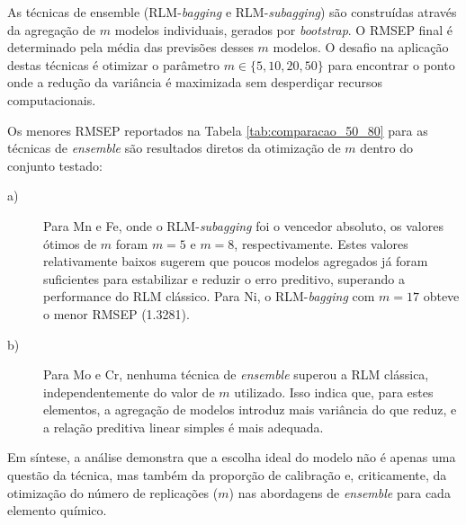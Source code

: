 As técnicas de ensemble (RLM-\textit{bagging} e RLM-\textit{subagging}) são construídas através da agregação de $m$ modelos individuais, gerados por \textit{bootstrap}. O RMSEP final é determinado pela média das previsões desses $m$ modelos.
O desafio na aplicação destas técnicas é otimizar o parâmetro $m \in \{5, 10, 20, 50\}$ para encontrar o ponto onde a redução da variância é maximizada sem desperdiçar recursos computacionais.

Os menores RMSEP reportados na Tabela \ref{tab:comparacao_50_80} para as técnicas de \textit{ensemble} são resultados diretos da otimização de $m$ dentro do conjunto testado:

\begin{description}
\item[a)] Para Mn e Fe, onde o RLM-\textit{subagging} foi o vencedor absoluto, os valores ótimos de $m$ foram $m=5$ e $m=8$, respectivamente. Estes valores relativamente baixos sugerem que poucos modelos agregados já foram suficientes para estabilizar e reduzir o erro preditivo, superando a performance do RLM clássico. Para Ni, o RLM-\textit{bagging} com $m=17$ obteve o menor RMSEP (\num{1,3281}).
\item[b)] Para Mo e Cr, nenhuma técnica de \textit{ensemble} superou a RLM clássica, independentemente do valor de $m$ utilizado. Isso indica que, para estes elementos, a agregação de modelos introduz mais variância do que reduz, e a relação preditiva linear simples é mais adequada.
\end{description}

Em síntese, a análise demonstra que a escolha ideal do modelo não é apenas uma questão da técnica, mas também da proporção de calibração e, criticamente, da otimização do número de replicações ($m$) nas abordagens de \textit{ensemble} para cada elemento químico.

